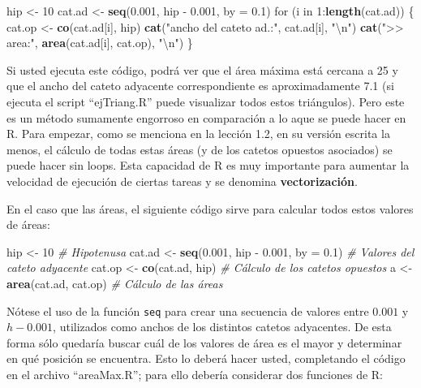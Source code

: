 \documentclass[]{article}
\newenvironment{Shaded}{}{}
\newcommand{\KeywordTok}[1]{\textcolor[rgb]{0.00,0.44,0.13}{\textbf{{#1}}}}
\newcommand{\DataTypeTok}[1]{\textcolor[rgb]{0.56,0.13,0.00}{{#1}}}
\newcommand{\DecValTok}[1]{\textcolor[rgb]{0.25,0.63,0.44}{{#1}}}
\newcommand{\FloatTok}[1]{\textcolor[rgb]{0.25,0.63,0.44}{{#1}}}
\newcommand{\CharTok}[1]{\textcolor[rgb]{0.25,0.44,0.63}{{#1}}}
\newcommand{\StringTok}[1]{\textcolor[rgb]{0.25,0.44,0.63}{{#1}}}
\newcommand{\CommentTok}[1]{\textcolor[rgb]{0.38,0.63,0.69}{\textit{{#1}}}}
\newcommand{\NormalTok}[1]{{#1}}
\begin{document}
\begin{Shaded}
\begin{Highlighting}[]
\NormalTok{hip <- }\DecValTok{10}
\NormalTok{cat.ad <- }\KeywordTok{seq}\NormalTok{(}\FloatTok{0.001}\NormalTok{, hip - }\FloatTok{0.001}\NormalTok{, }\DataTypeTok{by =} \FloatTok{0.1}\NormalTok{)}
\NormalTok{for (i in }\DecValTok{1}\NormalTok{:}\KeywordTok{length}\NormalTok{(cat.ad)) \{}
    \NormalTok{cat.op <- }\KeywordTok{co}\NormalTok{(cat.ad[i], hip)}
    \KeywordTok{cat}\NormalTok{(}\StringTok{"ancho del cateto ad.:"}\NormalTok{, cat.ad[i], }\StringTok{"}\CharTok{\textbackslash{}n}\StringTok{"}\NormalTok{)}
    \KeywordTok{cat}\NormalTok{(}\StringTok{">> area:"}\NormalTok{, }\KeywordTok{area}\NormalTok{(cat.ad[i], cat.op), }\StringTok{"}\CharTok{\textbackslash{}n}\StringTok{"}\NormalTok{)}
\NormalTok{\}}
\end{Highlighting}
\end{Shaded}
Si usted ejecuta este código, podrá ver que el área máxima está cercana
a 25 y que el ancho del cateto adyacente correspondiente es
aproximadamente 7.1 (si ejecuta el script ``ejTriang.R'' puede
visualizar todos estos triángulos). Pero este es un método sumamente
engorroso en comparación a lo aque se puede hacer en R. Para empezar,
como se menciona en la lección 1.2, en su versión escrita la menos, el
cálculo de todas estas áreas (y de los catetos opuestos asociados) se
puede hacer sin loops. Esta capacidad de R es muy importante para
aumentar la velocidad de ejecución de ciertas tareas y se denomina
\textbf{vectorización}.

En el caso que las áreas, el siguiente código sirve para calcular todos
estos valores de áreas:

\begin{Shaded}
\begin{Highlighting}[]
\NormalTok{hip <- }\DecValTok{10}  \CommentTok{# Hipotenusa}
\NormalTok{cat.ad <- }\KeywordTok{seq}\NormalTok{(}\FloatTok{0.001}\NormalTok{, hip - }\FloatTok{0.001}\NormalTok{, }\DataTypeTok{by =} \FloatTok{0.1}\NormalTok{)  }\CommentTok{# Valores del cateto adyacente}
\NormalTok{cat.op <- }\KeywordTok{co}\NormalTok{(cat.ad, hip)  }\CommentTok{# Cálculo de los catetos opuestos}
\NormalTok{a <- }\KeywordTok{area}\NormalTok{(cat.ad, cat.op)  }\CommentTok{# Cálculo de las áreas}
\end{Highlighting}
\end{Shaded}
Nótese el uso de la función \texttt{seq} para crear una secuencia de
valores entre $0.001$ y $h - 0.001$, utilizados como anchos de los
distintos catetos adyacentes. De esta forma sólo quedaría buscar cuál de
los valores de área es el mayor y determinar en qué posición se
encuentra. Esto lo deberá hacer usted, completando el código en el
archivo ``areaMax.R''; para ello debería considerar dos funciones de R:
\end{document}
